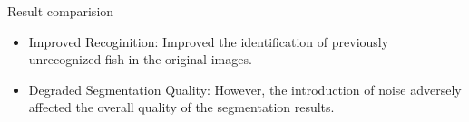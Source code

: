 \begin{frame}{Result comparision}
    \begin{itemize}
        \item Improved Recoginition: Improved the identification of previously unrecognized fish in the original images.
        \item Degraded Segmentation Quality: However, the introduction of noise adversely affected the overall quality of the segmentation results.
    \end{itemize}    
    
   
\end{frame}














